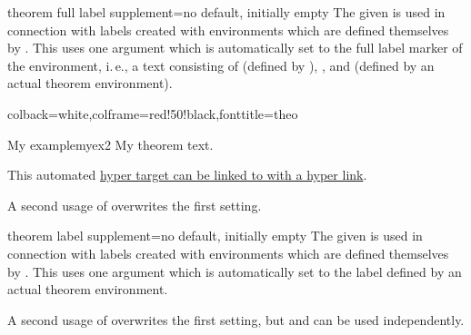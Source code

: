 \clearpage

\begin{docTcbKey}[][doc new=2018-01-12]{theorem full label supplement}{=}{no default, initially empty}
  The given  is used in connection with labels created with environments which
  are defined themselves by .
  This  uses one argument which is automatically set to the
  full label marker of the environment, i.\,e., a text consisting of
   (defined by ),
  ,
  and  (defined by an actual theorem environment).

\begin{dispExample}
{}

%
   {colback=white,colframe=red!50!black,fonttitle=\bfseries}{theo}
\begin{sometheorem}{My example}{myex2}
My theorem text.
\end{sometheorem}
This automated \hyperlink{theo:myex2}{hyper target can be linked to with a
 hyper link}.
\end{dispExample}

A second usage of  overwrites
the first setting.
\end{docTcbKey}


\begin{docTcbKey}[][doc new=2018-01-12]{theorem label supplement}{=}{no default, initially empty}
  The given  is used in connection with labels created with environments which
  are defined themselves by .
  This  uses one argument which is automatically set to the
  label  defined by an actual theorem environment.\par
  A second usage of  overwrites
  the first setting, but
  and  can be used independently.

\end{docTcbKey}


